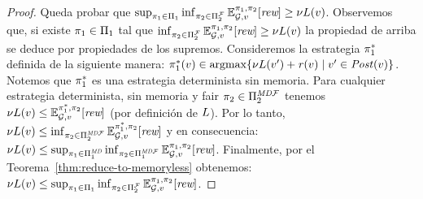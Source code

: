 \begin{proof}
  Queda probar que $\sup_{\pi_{1} \in \Pi_{1}}   \inf_{\pi_{2} \in \Pi^{\mathcal{F}}_{2}}  \mathbb{E}^{\pi_{1}, \pi_{2}}_{\mathcal{G},v}[\textit{rew}] \geq \nu L(v)$. Observemos que, si existe  $\pi_{1} \in \Pi_{1}$ tal que
  $\inf_{\pi_{2} \in \Pi^{\mathcal{F}}_{2}}  \mathbb{E}^{\pi_{1}, \pi_{2}}_{\mathcal{G},v}[\textit{rew}] \geq \nu L(v)$ la propiedad de arriba se deduce por propiedades de los supremos. Consideremos la estrategia $\pi^*_{1}$ definida de la siguiente manera:
  $\pi^*_{1}(v) \in \operatorname*{argmax} \{\nu L(v') + \mathit{r}(v) \mid v' \in \mathit{Post}(v) \}$. Notemos que $\pi^*_{1}$ es una estrategia determinista sin memoria. Para cualquier estrategia determinista, sin memoria y fair $\pi_{2} \in \Pi^{\textit{MD}\mathcal{F}}_{2}$ tenemos
  $\nu L(v) \leq \mathbb{E}^{\pi^*_{1}, \pi_{2}}_{\mathcal{G},v}[\textit{rew}]$ (por definición de $L$).  Por lo tanto,
  $\nu L(v) \leq \inf_{\pi_{2} \in \Pi^{\textit{MD}\mathcal{F}}_{2}} \mathbb{E}^{\pi^*_{1}, \pi_{2}}_{\mathcal{G},v}[\textit{rew}]$
  y en consecuencia:
  $\nu L(v) \leq \sup_{\pi_{1} \in \Pi^{\textit{MD}}_{1}} \inf_{\pi_{2} \in \Pi^{\textit{MD}\mathcal{F}}_{1}} \mathbb{E}^{\pi_{1}, \pi_{2}}_{\mathcal{G},v}[\textit{rew}]$.
  Finalmente, por el Teorema~\ref{thm:reduce-to-memoryless} obtenemos:
  $\nu L(v) \leq \sup_{\pi_{1} \in \Pi_{1}} \inf_{\pi_{2} \in \Pi^{\mathcal{F}}_{2}} \mathbb{E}^{\pi_{1}, \pi_{2}}_{\mathcal{G},v}[\textit{rew}]$.
  \qedhere
\end{proof}
%
